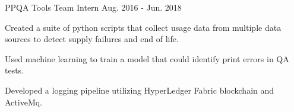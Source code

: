 \begin{cventries}
  \cventry
    {PPQA Tools Team Intern} %
    { } %
    { } %
    {Aug. 2016 - Jun. 2018} %
    {
      \begin{cvitems} %
        \item {Created a suite of python scripts that collect usage data from multiple data sources to detect supply failures and end of life.}
        \item {Used machine learning to train a model that could identify print errors in QA tests.}
        \item {Developed a logging pipeline utilizing HyperLedger Fabric blockchain and ActiveMq.}
      \end{cvitems}
    }

\end{cventries}
